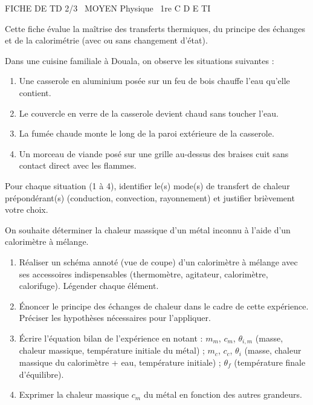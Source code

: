 \documentclass[11pt]{article}
\begin{document}
\begin{tcolorbox}[enhanced,colback=popink,colframe=popink,arc=10pt,boxrule=0pt,left=12pt,right=12pt,top=9pt,bottom=9pt]
{\color{white}\popxbold\small FICHE DE TD 2/3 \textbullet\ MOYEN \hfill Physique \textbullet\ 1re C D E TI\par}
\end{tcolorbox}
\vspace{4pt}
Cette fiche évalue la maîtrise des transferts thermiques, du principe des échanges et de la calorimétrie (avec ou sans changement d'état).

\begin{exercice}
Dans une cuisine familiale à Douala, on observe les situations suivantes :
\begin{enumerate}
    \item Une casserole en aluminium posée sur un feu de bois chauffe l'eau qu'elle contient.
    \item Le couvercle en verre de la casserole devient chaud sans toucher l'eau.
    \item La fumée chaude monte le long de la paroi extérieure de la casserole.
    \item Un morceau de viande posé sur une grille au-dessus des braises cuit sans contact direct avec les flammes.
\end{enumerate}
Pour chaque situation (1 à 4), identifier le(s) mode(s) de transfert de chaleur prépondérant(s) (conduction, convection, rayonnement) et justifier brièvement votre choix.
\end{exercice}

\begin{exercice}
On souhaite déterminer la chaleur massique d'un métal inconnu à l'aide d'un calorimètre à mélange.
\begin{enumerate}
    \item Réaliser un schéma annoté (vue de coupe) d'un calorimètre à mélange avec ses accessoires indispensables (thermomètre, agitateur, calorimètre, calorifuge). Légender chaque élément.
    \item Énoncer le principe des échanges de chaleur dans le cadre de cette expérience. Préciser les hypothèses nécessaires pour l'appliquer.
    \item Écrire l'équation bilan de l'expérience en notant : $m_m$, $c_m$, $\theta_{i,m}$ (masse, chaleur massique, température initiale du métal) ; $m_c$, $c_c$, $\theta_i$ (masse, chaleur massique du calorimètre + eau, température initiale) ; $\theta_f$ (température finale d'équilibre).
    \item Exprimer la chaleur massique $c_m$ du métal en fonction des autres grandeurs.
\end{enumerate}
\end{exercice}
\end{document}
